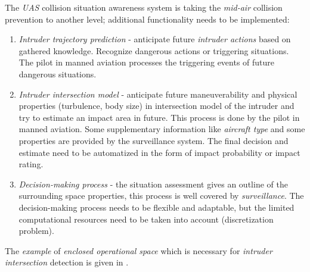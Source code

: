 The \emph{UAS} collision situation awareness system is taking the \emph{mid-air} collision prevention to another level; additional functionality needs to be implemented:

\begin{enumerate}
    \item \emph{Intruder trajectory prediction} - anticipate future \emph{intruder actions} based on gathered knowledge. Recognize dangerous actions or triggering situations. The pilot in manned aviation processes the triggering events of future dangerous situations.
    
    \item \emph{Intruder intersection model} - anticipate future maneuverability and physical properties (turbulence, body size) in intersection model of the intruder and try to estimate an impact area in future. This process is done by the pilot in manned aviation. Some supplementary information like \emph{aircraft type} and some properties are provided by the surveillance system. The final decision and estimate need to be automatized in the form of impact probability or impact rating. 
    
    \item \emph{Decision-making process} - the situation assessment gives an outline of the surrounding space properties, this process is well covered by \emph{surveillance}. The decision-making process needs to be flexible and adaptable, but the limited computational resources need to be taken into account (discretization problem).
\end{enumerate}

\begin{note}
    The \emph{example} of \emph{enclosed operational space} which is necessary for \emph{intruder intersection} detection is given in \cite{welzl1991smallest}.
\end{note}